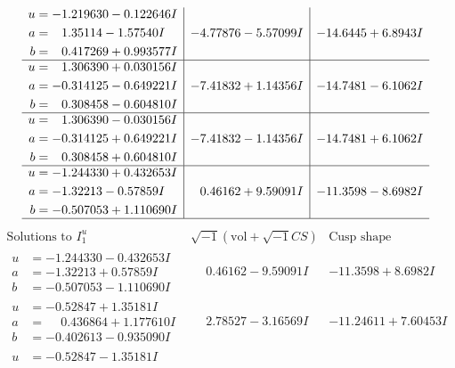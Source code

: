 \documentclass[1p]{elsarticle_modified}
\theoremstyle{definition}
\newcommand{\I}{\sqrt{-1}}
\begin{document}
$$\begin{array}{c|c|c}
\begin{aligned}
u &= -1.219630 - 0.122646 I \\
a &= \phantom{-}1.35114 - 1.57540 I \\
b &= \phantom{-}0.417269 + 0.993577 I\end{aligned}
 & -4.77876 - 5.57099 I & -14.6445 + 6.8943 I \\ \hline\begin{aligned}
u &= \phantom{-}1.306390 + 0.030156 I \\
a &= -0.314125 - 0.649221 I \\
b &= \phantom{-}0.308458 - 0.604810 I\end{aligned}
 & -7.41832 + 1.14356 I & -14.7481 - 6.1062 I \\ \hline\begin{aligned}
u &= \phantom{-}1.306390 - 0.030156 I \\
a &= -0.314125 + 0.649221 I \\
b &= \phantom{-}0.308458 + 0.604810 I\end{aligned}
 & -7.41832 - 1.14356 I & -14.7481 + 6.1062 I \\ \hline\begin{aligned}
u &= -1.244330 + 0.432653 I \\
a &= -1.32213 - 0.57859 I \\
b &= -0.507053 + 1.110690 I\end{aligned}
 & \phantom{-}0.46162 + 9.59091 I & -11.3598 - 8.6982 I\\
 \hline 
 \end{array}$$\newpage$$\begin{array}{c|c|c}  
\text{Solutions to }I^u_{1}& \I (\text{vol} + \sqrt{-1}CS) & \text{Cusp shape}\\
 \hline 
\begin{aligned}
u &= -1.244330 - 0.432653 I \\
a &= -1.32213 + 0.57859 I \\
b &= -0.507053 - 1.110690 I\end{aligned}
 & \phantom{-}0.46162 - 9.59091 I & -11.3598 + 8.6982 I \\ \hline\begin{aligned}
u &= -0.52847 + 1.35181 I \\
a &= \phantom{-}0.436864 + 1.177610 I \\
b &= -0.402613 - 0.935090 I\end{aligned}
 & \phantom{-}2.78527 - 3.16569 I & -11.24611 + 7.60453 I \\ \hline\begin{aligned}
u &= -0.52847 - 1.35181 I \\

\end{aligned}
\end{array}$$
\end{document}
